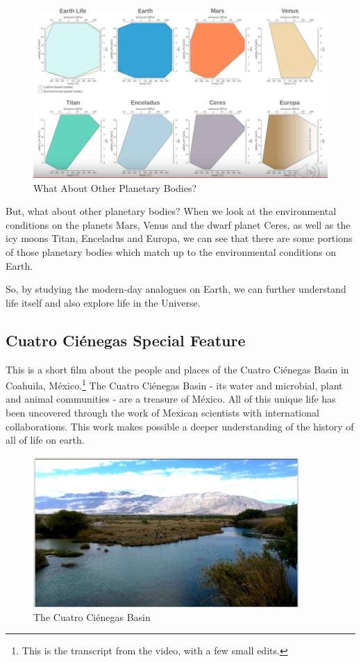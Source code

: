 \documentclass[]{article}
\begin{document}
\begin{figure}[H]
	\caption{What About Other Planetary Bodies?}\label{fig:WhatAboutOtherPlanetaryBodies}
	\includegraphics[width=\textwidth]{WhatAboutOtherPlanetaryBodies}
\end{figure}
But, what about other planetary bodies?
When we look at
the environmental conditions
on the planets Mars, Venus
and the dwarf planet Ceres,
as well as the icy moons Titan,
Enceladus and Europa,
we can see that there are some portions
of those planetary bodies
which match up to the environmental
conditions on Earth.

So, by studying the modern-day analogues
on Earth,
we can further understand life itself
and also explore life in the Universe.


\subsection{Cuatro Ci\'enegas Special Feature}

This is a short film about the people and places of the Cuatro Ci\'enegas Basin in Coahuila, M\'exico.\footnote{This is the transcript from the video, with a few small edits.} The Cuatro Ci\'enegas Basin - its water and microbial, plant and animal communities -
are a treasure of M\'exico. All of this unique life has been uncovered through the work of Mexican scientists with international collaborations. This work makes possible a deeper understanding of the history of all of life on earth.

\begin{figure}[H]
	\caption{The Cuatro Ci\'enegas Basin} 
	\includegraphics[width=0.9\textwidth]{CuatroCienegas1}
\end{figure}
\end{document}
